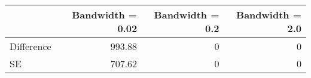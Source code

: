 \begin{table}[h!]
\begin{center}
\begin{tabular}{lrrr}
\toprule
 & Bandwidth = 0.02 & Bandwidth = 0.2 & Bandwidth = 2.0  \\
\hline
Difference & 993.88 & 0 & 0 \\
SE & 707.62 & 0 & 0 \\
\bottomrule
\end{tabular}
\end{center}
\end{table}
